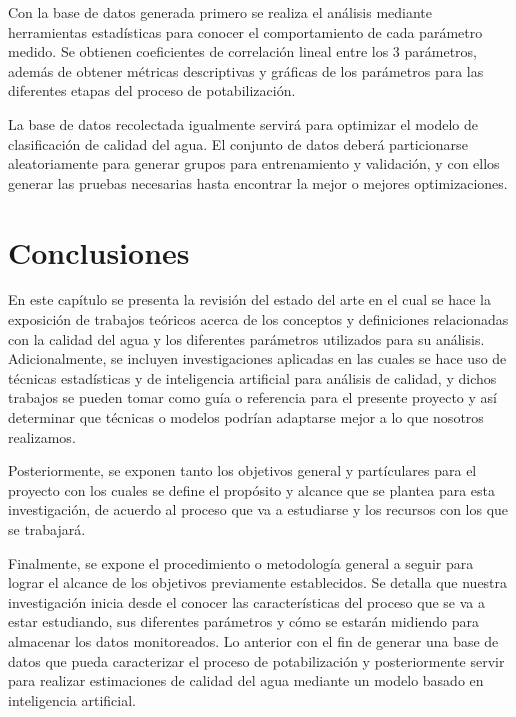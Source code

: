 Con la base de datos generada primero se realiza el análisis mediante herramientas estadísticas para conocer el comportamiento de cada parámetro medido. Se obtienen coeficientes de correlación lineal entre los 3 parámetros,
además de obtener métricas descriptivas y gráficas de los parámetros para las diferentes etapas del proceso de potabilización.

La base de datos recolectada igualmente servirá para optimizar el modelo de clasificación de calidad del agua. El conjunto de datos deberá particionarse aleatoriamente para generar grupos para entrenamiento y validación, y 
con ellos generar las pruebas necesarias hasta encontrar la mejor o mejores optimizaciones.

\clearpage

\section{Conclusiones}

En este capítulo se presenta la revisión del estado del arte en el cual se hace la exposición de trabajos teóricos acerca de los conceptos y definiciones relacionadas con la calidad del agua y los diferentes parámetros utilizados 
para su análisis. Adicionalmente, se incluyen investigaciones aplicadas en las cuales se hace uso de técnicas estadísticas y de inteligencia artificial para análisis de calidad, y dichos trabajos se pueden tomar como guía o 
referencia para el presente proyecto y así determinar que técnicas o modelos podrían adaptarse mejor a lo que nosotros realizamos.

Posteriormente, se exponen tanto los objetivos general y partículares para el proyecto con los cuales se define el propósito y alcance que se plantea para esta investigación, de acuerdo al proceso que va a estudiarse y los 
recursos con los que se trabajará. 

Finalmente, se expone el procedimiento o metodología general a seguir para lograr el alcance de los objetivos previamente establecidos. Se detalla que nuestra investigación inicia desde el conocer las características del 
proceso que se va a estar estudiando, sus diferentes parámetros y cómo se estarán midiendo para almacenar los datos monitoreados. Lo anterior con el fin de generar una base de datos que pueda caracterizar el proceso de 
potabilización y posteriormente servir para realizar estimaciones de calidad del agua mediante un modelo basado en inteligencia artificial.

\clearpage
